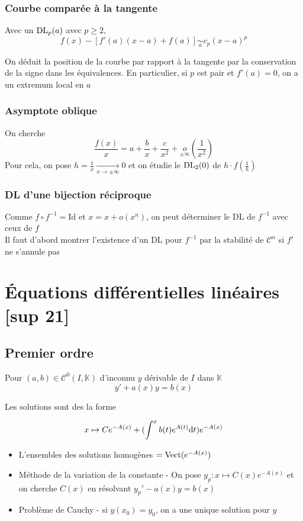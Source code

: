 \documentclass[openany]{book}
\begin{document}
\subsubsection{Courbe comparée à la tangente}
Avec un $\text{DL}_{p}(a)$ avec $p \geq 2$, 
\[ f(x) - [f'(a)(x-a) + f(a)] \underset{a}{\sim} c_p(x-a)^p \]

\noindent On déduit la position de la courbe par rapport à la tangente par la conservation de la signe dans les équivalences. En particulier, si $p$ est pair et $f'(a) = 0$, on a un extremum local en $a$ 

\subsubsection{Asymptote oblique}
On cherche 
\[ \frac{f(x)}{x} = a + \frac{b}{x} + \frac{c}{x^2} + \underset{\pm \infty}{o} (\frac{1}{x^2}) \]
\noindent Pour cela, on pose $h = \frac{1}{x} \underset{x \rightarrow \pm \infty}{\longrightarrow} 0$ et on étudie le $\text{DL}_{2}(0)$ de $h \cdot f(\frac{1}{h})$

\subsubsection{DL d'une bijection réciproque}
Comme $f \circ f^{-1} = \text{Id}$ et $x = x + o(x^n)$, on peut déterminer le DL de $f^{-1}$ avec ceux de $f$ \\
Il faut d'abord montrer l'existence d'un DL pour $f^{-1}$ par la stabilité de $\mathcal{C}^n$ si $f'$ ne s'annule pas

\clearpage
\section{Équations différentielles linéaires [sup 21]}

\subsection{Premier ordre}
Pour $(a, b) \in \mathcal{C}^0(I, \mathbb{K})$ d'inconnu $y$ dérivable de $I$ dans $\mathbb{K}$
\[ y' + a(x)y = b(x) \]

\noindent Les solutions sont des la forme

\[ x \mapsto Ce^{-A(x)} + (\int_{}^{x} b(t) e^{A(t)} \text{d}t)e^{-A(x)} \]

\begin{itemize}
    \item L'ensembles des solutions homogènes $ = \text{Vect} (e^{-A(x)})$
    \item Méthode de la variation de la constante - On pose $y_p : x \mapsto C(x)e^{-A(x)}$ et on cherche $C(x)$ en résolvant $y_p' - a(x)y = b(x)$
    \item Problème de Cauchy - si $y(x_0) = y_0$, on a une unique solution pour $y$
\end{itemize}
\end{document}
